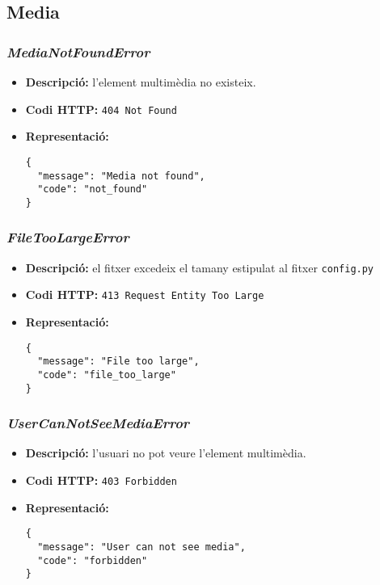 \subsection{Media}
\subsubsection{\emph{MediaNotFoundError}}
\begin{itemize}
	\item \textbf{Descripció:} l'element multimèdia no existeix.
	\item \textbf{Codi \ac{HTTP}:} \texttt{404 Not Found}
	\item \textbf{Representació:}
\begin{verbatim}
{
  "message": "Media not found",
  "code": "not_found"
}
\end{verbatim}
\end{itemize}


\subsubsection{\emph{FileTooLargeError}}
\begin{itemize}
	\item \textbf{Descripció:} el fitxer excedeix el tamany estipulat al fitxer \texttt{config.py}
	\item \textbf{Codi \ac{HTTP}:} \texttt{413 Request Entity Too Large}
	\item \textbf{Representació:}
\begin{verbatim}
{
  "message": "File too large",
  "code": "file_too_large"
}
\end{verbatim}
\end{itemize}

\subsubsection{\emph{UserCanNotSeeMediaError}}
\begin{itemize}
	\item \textbf{Descripció:} l'usuari no pot veure l'element multimèdia.
	\item \textbf{Codi \ac{HTTP}:} \texttt{403 Forbidden}
	\item \textbf{Representació:}
\begin{verbatim}
{
  "message": "User can not see media",
  "code": "forbidden"
}
\end{verbatim}
\end{itemize}
